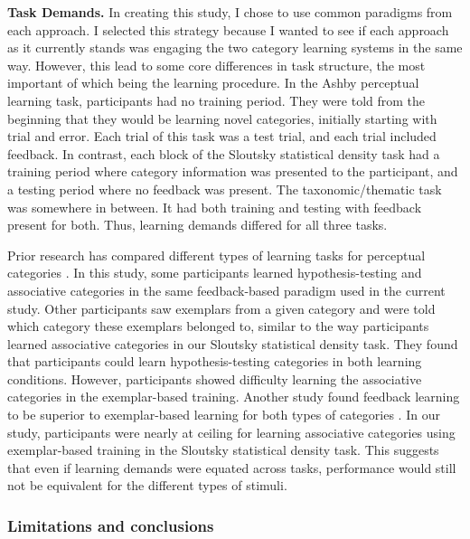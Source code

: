 \documentclass[../dissertation.tex]{subfiles}
\begin{document}
\textbf{Task Demands.} In creating this study, I chose to use common paradigms from each approach. I selected this strategy because I wanted to see if each approach as it currently stands was engaging the two category learning systems in the same way. However, this lead to some core differences in task structure, the most important of which being the learning procedure. In the Ashby perceptual learning task, participants had no training period. They were told from the beginning that they would be learning novel categories, initially starting with trial and error. Each trial of this task was a test trial, and each trial included feedback. In contrast, each block of the Sloutsky statistical density task had a training period where category information was presented to the participant, and a testing period where no feedback was present. The taxonomic/thematic task was somewhere in between. It had both training and testing with feedback present for both. Thus, learning demands differed for all three tasks. \par 
Prior research has compared different types of learning tasks for perceptual categories \citep{Ashby2002}. In this study, some participants learned hypothesis-testing and associative categories in the same feedback-based paradigm used in the current study. Other participants saw exemplars from a given category and were told which category these exemplars belonged to, similar to the way participants learned associative categories in our Sloutsky statistical density task. They found that participants could learn hypothesis-testing categories in both learning conditions. However, participants showed difficulty learning the associative categories in the exemplar-based training. Another study found feedback learning to be superior to exemplar-based learning for both types of categories \citep{Edmunds2015}. In our study, participants were nearly at ceiling for learning associative categories using exemplar-based training in the Sloutsky statistical density task. This suggests that even if learning demands were equated across tasks, performance would still not be equivalent for the different types of stimuli.
	
\subsubsection{Limitations and conclusions}
\end{document}
